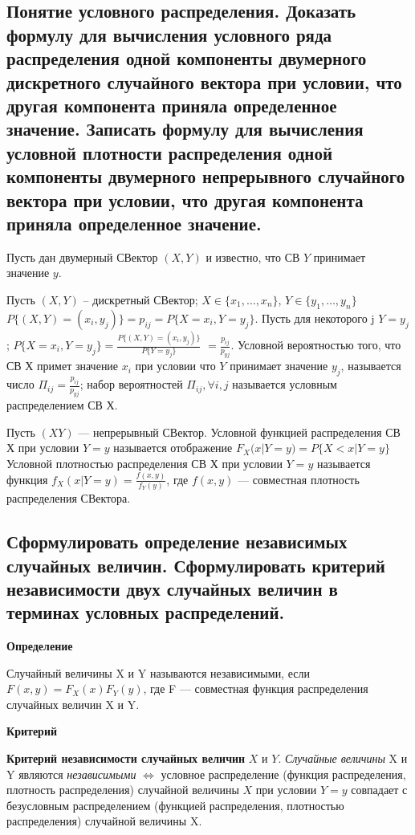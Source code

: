 \subsection{Понятие условного распределения. Доказать формулу для вычисления условного ряда распределения одной компоненты двумерного дискретного случайного вектора при условии, что другая компонента приняла определенное значение. Записать формулу для вычисления условной плотности распределения одной компоненты двумерного непрерывного случайного вектора при условии, что другая компонента приняла определенное значение.}


Пусть дан двумерный СВектор $(X, Y)$ и известно, что СВ $Y$ принимает значение $y$.


Пусть $(X, Y)$ – дискретный СВектор; $X \in \{x_1, \dots, x_n\}$, $Y \in \{y_1, \dots, y_n\}$ $P\{(X, Y)=(x_i, y_j)\} = p_{ij} = P\{X=x_i, Y=y_j\}$. Пусть для некоторого j $Y=y_j$; $P\{X=x_i, Y=y_j\} = \frac{P\{(X, Y)=(x_i, y_j)\}}{P\{Y=y_j\}}$ $=\frac{p_{ij}}{p_{yj}}$. Условной вероятностью того, что СВ Х примет значение $x_i$ при условии что $Y$ принимает значение $y_j$, называется число $\Pi_{ij}=\frac{p_{ij}}{p_{yj}}$; набор вероятностей $\Pi_{ij}, \forall i, j$ называется условным распределением СВ Х.

Пусть $(XY)$ --- непрерывный СВектор. Условной функцией распределения СВ Х при условии $Y = y$ называется отображение $F_X(x|Y=y) = P\{X < x|Y=y\}$ Условной плотностью распределения СВ Х при условии $Y=y$ называется функция $f_X(x|Y=y)=\frac{f(x, y)}{f_Y(y)}$, где $f(x,y)$ --- совместная плотность распределения СВектора.

\subsection{Сформулировать определение независимых случайных величин. Сформулировать критерий независимости двух случайных величин в терминах условных распределений.}

\textbf{Определение}

Случайный величины X и Y называются независимыми, если $F(x, y) = F_X(x)F_Y(y)$, где F --- совместная функция распределения случайных величин X и Y.

\textbf{Критерий}

\textbf{Критерий независимости случайных величин} $X$ и $Y$. \textit{Случайные величины} X и Y являются \textit{независимыми} $\Leftrightarrow$ условное распределение (функция распределения,
плотность распределения) случайной величины $X$ при условии $Y = y$ совпадает с безусловным распределением (функцией распределения, плотностью распределения) случайной величины X.

